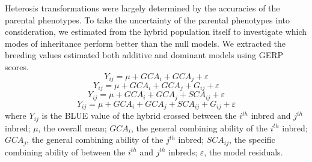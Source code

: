 \documentclass[9pt,twocolumn,twoside]{gsajnl}
\begin{document}
Heterosis transformations were largely determined by the accuracies of the parental phenotypes. 
To take the uncertainty of the parental phenotypes into consideration, we estimated  \DIFdelbegin {}\DIFdelend \DIFaddbegin {}\DIFaddend from the hybrid population itself to investigate which modes of inheritance perform better than the null models. 
We extracted the breeding values estimated \DIFdelbegin {}\DIFdelend \DIFaddbegin {}\DIFaddend both additive and dominant models using \DIFdelbegin {}\DIFdelend \DIFaddbegin {}\DIFaddend GERP scores. 
\DIFdelbegin {}\emph{} 
\DIFdelend \DIFaddbegin {}\DIFaddend \begin{equation}
Y_{ij} = \mu + GCA_{i} + GCA_{j} + \varepsilon
\label{eq:refname1}
\end{equation}
\begin{equation}
Y_{ij} = \mu + GCA_{i} + GCA_{j} +  G_{ij} + \varepsilon
\label{eq:refname2}
\end{equation}
\begin{equation}
Y_{ij} = \mu + GCA_{i} + GCA_{j} + SCA_{ij} + \varepsilon
\label{eq:refname3}
\end{equation}
\begin{equation}
Y_{ij} = \mu + GCA_{i} + GCA_{j} + SCA_{ij} + G_{ij} + \varepsilon
\label{eq:refname4}
\end{equation}
where 
$Y_{ij}$ is the BLUE value of the hybrid crossed between the $i^{th}$ inbred and $j^{th}$ inbred; 
$\mu$, the overall mean; 
$GCA_{i}$, the general combining ability of the $i^{th}$ inbred;
$GCA_{j}$, the general combining ability of the $j^{th}$ inbred;
$SCA_{ij}$, the specific combining ability of between the $i^{th}$ and $j^{th}$ inbreds;
\DIFaddbegin {}\DIFaddend $\varepsilon$, the model residuals.
\end{document}
